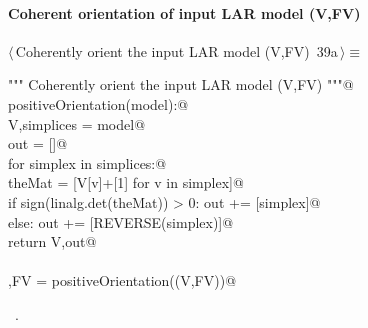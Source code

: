 \documentclass[11pt,oneside]{article}    %
\begin{document}
\paragraph{Coherent orientation of input LAR model (V,FV)}
\begin{flushleft} \small \label{scrap63}
\protect{}$\langle\,$Coherently orient the input LAR model (V,FV)\nobreak\ {\footnotesize 39a}$\,\rangle\equiv$
\vspace{-1ex}
\begin{list}{}{} \item
\mbox{}\verb@""" Coherently orient the input LAR model (V,FV) """@\\
\mbox{}\verb@def positiveOrientation(model):@\\
\mbox{}\verb@    V,simplices = model@\\
\mbox{}\verb@    out = []@\\
\mbox{}\verb@    for simplex in simplices:@\\
\mbox{}\verb@        theMat = [V[v]+[1] for v in simplex]@\\
\mbox{}\verb@        if sign(linalg.det(theMat)) > 0:  out += [simplex]@\\
\mbox{}\verb@        else: out += [REVERSE(simplex)]@\\
\mbox{}\verb@    return V,out@\\
\mbox{}\verb@@\\
\mbox{}\verb@V,FV = positiveOrientation((V,FV))@\\
\mbox{}\verb@@{\NWsep}
\end{list}
\vspace{-1ex}
\footnotesize\addtolength{\baselineskip}{-1ex}
\begin{list}{}{\setlength{\itemsep}{-\parsep}\setlength{\itemindent}{-\leftmargin}}
\item \NWtxtMacroRefIn\ .
\end{list}
\end{flushleft}
\end{document}
